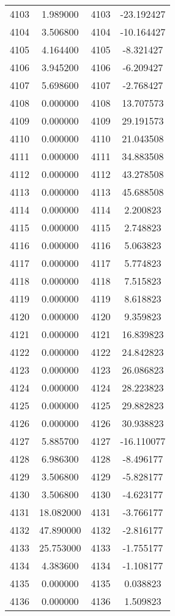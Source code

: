 \documentclass[12pt]{article}
\begin{document}
\begin{longtable}{@{}cccc@{}}
4103 & 1.989000 & 4103 & -23.192427 \\
4104 & 3.506800 & 4104 & -10.164427 \\
4105 & 4.164400 & 4105 & -8.321427 \\
4106 & 3.945200 & 4106 & -6.209427 \\
4107 & 5.698600 & 4107 & -2.768427 \\
4108 & 0.000000 & 4108 & 13.707573 \\
4109 & 0.000000 & 4109 & 29.191573 \\
4110 & 0.000000 & 4110 & 21.043508 \\
4111 & 0.000000 & 4111 & 34.883508 \\
4112 & 0.000000 & 4112 & 43.278508 \\
4113 & 0.000000 & 4113 & 45.688508 \\
4114 & 0.000000 & 4114 & 2.200823 \\
4115 & 0.000000 & 4115 & 2.748823 \\
4116 & 0.000000 & 4116 & 5.063823 \\
4117 & 0.000000 & 4117 & 5.774823 \\
4118 & 0.000000 & 4118 & 7.515823 \\
4119 & 0.000000 & 4119 & 8.618823 \\
4120 & 0.000000 & 4120 & 9.359823 \\
4121 & 0.000000 & 4121 & 16.839823 \\
4122 & 0.000000 & 4122 & 24.842823 \\
4123 & 0.000000 & 4123 & 26.086823 \\
4124 & 0.000000 & 4124 & 28.223823 \\
4125 & 0.000000 & 4125 & 29.882823 \\
4126 & 0.000000 & 4126 & 30.938823 \\
4127 & 5.885700 & 4127 & -16.110077 \\
4128 & 6.986300 & 4128 & -8.496177 \\
4129 & 3.506800 & 4129 & -5.828177 \\
4130 & 3.506800 & 4130 & -4.623177 \\
4131 & 18.082000 & 4131 & -3.766177 \\
4132 & 47.890000 & 4132 & -2.816177 \\
4133 & 25.753000 & 4133 & -1.755177 \\
4134 & 4.383600 & 4134 & -1.108177 \\
4135 & 0.000000 & 4135 & 0.038823 \\
4136 & 0.000000 & 4136 & 1.509823 \\

\end{longtable}
\end{document}
